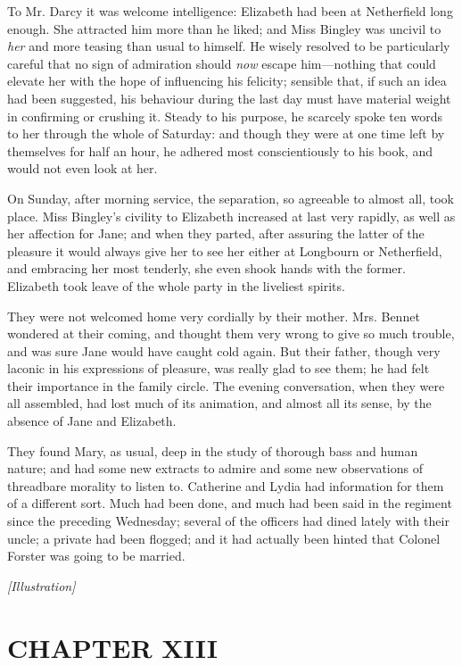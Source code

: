 \documentclass[12pt]{book}
\begin{document}
To Mr. Darcy it was welcome intelligence: Elizabeth had been at Netherfield long enough. She attracted him more than he liked; and Miss Bingley was uncivil to \textit{her} and more teasing than usual to himself. He wisely resolved to be particularly careful that no sign of admiration should \textit{now} escape him---nothing that could elevate her with the hope of influencing his felicity; sensible that, if such an idea had been suggested, his behaviour during the last day must have material weight in confirming or crushing it. Steady to his purpose, he scarcely spoke ten words to her through the whole of Saturday: and though they were at one time left by themselves for half an hour, he adhered most conscientiously to his book, and would not even look at her.

On Sunday, after morning service, the separation, so agreeable to almost all, took place. Miss Bingley's civility to Elizabeth increased at last very rapidly, as well as her affection for Jane; and when they parted, after assuring the latter of the pleasure it would always give her to see her either at Longbourn or Netherfield, and embracing her most tenderly, she even shook hands with the former. Elizabeth took leave of the whole party in the liveliest spirits.

They were not welcomed home very cordially by their mother. Mrs. Bennet wondered at their coming, and thought them very wrong to give so much trouble, and was sure Jane would have caught cold again. But their father, though very laconic in his expressions of pleasure, was really glad to see them; he had felt their importance in the family circle. The evening conversation, when they were all assembled, had lost much of its animation, and almost all its sense, by the absence of Jane and Elizabeth.

They found Mary, as usual, deep in the study of thorough bass and human nature; and had some new extracts to admire and some new observations of threadbare morality to listen to. Catherine and Lydia had information for them of a different sort. Much had been done, and much had been said in the regiment since the preceding Wednesday; several of the officers had dined lately with their uncle; a private had been flogged; and it had actually been hinted that Colonel Forster was going to be married.

\emph{[Illustration]}

\chapter{CHAPTER XIII}
\end{document}
